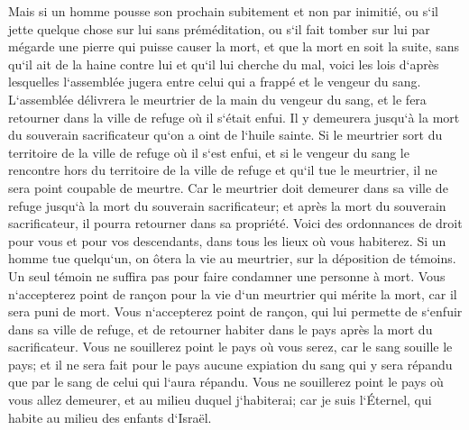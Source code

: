 \verse Mais si un homme pousse son prochain subitement et non par inimitié, ou s`il jette quelque chose sur lui sans préméditation, 
\verse ou s`il fait tomber sur lui par mégarde une pierre qui puisse causer la mort, et que la mort en soit la suite, sans qu`il ait de la haine contre lui et qu`il lui cherche du mal, 
\verse voici les lois d`après lesquelles l`assemblée jugera entre celui qui a frappé et le vengeur du sang. 
\verse L`assemblée délivrera le meurtrier de la main du vengeur du sang, et le fera retourner dans la ville de refuge où il s`était enfui. Il y demeurera jusqu`à la mort du souverain sacrificateur qu`on a oint de l`huile sainte. 
\verse Si le meurtrier sort du territoire de la ville de refuge où il s`est enfui, 
\verse et si le vengeur du sang le rencontre hors du territoire de la ville de refuge et qu`il tue le meurtrier, il ne sera point coupable de meurtre. 
\verse Car le meurtrier doit demeurer dans sa ville de refuge jusqu`à la mort du souverain sacrificateur; et après la mort du souverain sacrificateur, il pourra retourner dans sa propriété. 
\verse Voici des ordonnances de droit pour vous et pour vos descendants, dans tous les lieux où vous habiterez. 
\verse Si un homme tue quelqu`un, on ôtera la vie au meurtrier, sur la déposition de témoins. Un seul témoin ne suffira pas pour faire condamner une personne à mort. 
\verse Vous n`accepterez point de rançon pour la vie d`un meurtrier qui mérite la mort, car il sera puni de mort. 
\verse Vous n`accepterez point de rançon, qui lui permette de s`enfuir dans sa ville de refuge, et de retourner habiter dans le pays après la mort du sacrificateur. 
\verse Vous ne souillerez point le pays où vous serez, car le sang souille le pays; et il ne sera fait pour le pays aucune expiation du sang qui y sera répandu que par le sang de celui qui l`aura répandu. 
\verse Vous ne souillerez point le pays où vous allez demeurer, et au milieu duquel j`habiterai; car je suis l`Éternel, qui habite au milieu des enfants d`Israël. 

